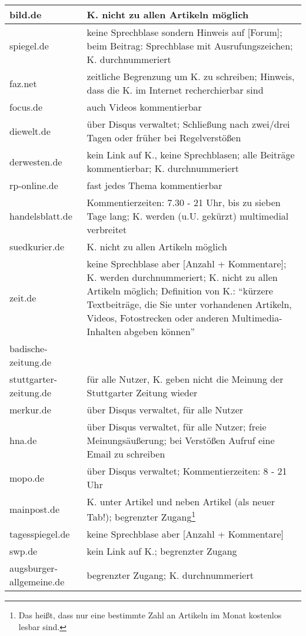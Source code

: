 \begin{landscape}
\begin{longtable}{l|p{170mm}}
\hline
bild.de			& K. nicht zu allen Artikeln möglich \\\hline
spiegel.de		  	& keine Sprechblase sondern Hinweis auf [Forum]; beim Beitrag: Sprechblase mit Ausrufungszeichen; K. durchnummeriert \\\hline
faz.net			& zeitliche Begrenzung um K. zu schreiben; Hinweis, dass die K. im Internet recherchierbar sind\\\hline
focus.de			& auch Videos kommentierbar \\\hline
diewelt.de			& über Disqus verwaltet; Schließung nach zwei/drei Tagen oder früher bei Regelverstößen \\\hline
derwesten.de		& kein Link auf K., keine Sprechblasen; alle Beiträge kommentierbar; K. durchnummeriert \\\hline
rp-online.de		& fast jedes Thema kommentierbar \\\hline
handelsblatt.de		& Kommentierzeiten: 7.30 - 21 Uhr, bis zu sieben Tage lang; K. werden (u.U. gekürzt) multimedial verbreitet \\\hline
suedkurier.de		& K. nicht zu allen Artikeln möglich \\\hline
zeit.de			& keine Sprechblase aber [Anzahl + Kommentare]; K. werden durchnummeriert;  K. nicht zu allen Artikeln möglich; Definition von K.: ``kürzere Textbeiträge, die Sie unter vorhandenen Artikeln, Videos, Fotostrecken oder anderen Multimedia-Inhalten abgeben können'' \\\hline
badische-zeitung.de	& \\\hline
stuttgarter-zeitung.de	& für alle Nutzer, K. geben nicht die Meinung der Stuttgarter Zeitung wieder\\\hline
merkur.de			& über Disqus verwaltet, für alle Nutzer\\\hline
hna.de			& über Disqus verwaltet, für alle Nutzer; freie Meinungsäußerung; bei Verstößen Aufruf eine Email zu schreiben \\\hline
mopo.de			& über Disqus verwaltet; Kommentierzeiten: 8 - 21 Uhr\\\hline
mainpost.de		& K. unter Artikel und neben Artikel (als neuer Tab!); begrenzter Zugang\footnote{Das heißt, dass nur eine bestimmte Zahl an Artikeln im Monat kostenlos lesbar sind.}\\\hline
tagesspiegel.de		& keine Sprechblase aber [Anzahl + Kommentare]\\\hline
swp.de			& kein Link auf K.; begrenzter Zugang\\\hline
augsburger-allgemeine.de	& begrenzter Zugang; K. durchnummeriert
\\ \hline               


\end{longtable}
\end{landscape}
